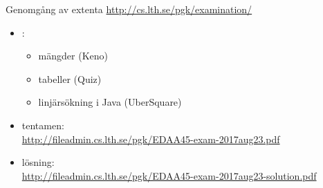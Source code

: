 















\begin{Slide}{Genomgång av extenta}
\url{http://cs.lth.se/pgk/examination/}

\vspace{1em}
\begin{itemize}
\item {}:
\begin{itemize}
  \item mängder (Keno)
  \item tabeller (Quiz)
  \item linjärsökning i Java (UberSquare)
\end{itemize}
\item tentamen:\\ \url{http://fileadmin.cs.lth.se/pgk/EDAA45-exam-2017aug23.pdf}
\item lösning:\\ \url{http://fileadmin.cs.lth.se/pgk/EDAA45-exam-2017aug23-solution.pdf}
\end{itemize}
\end{Slide}








\fi
